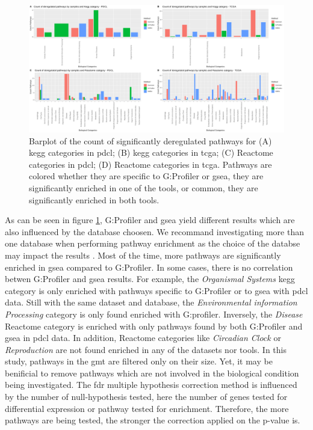 \begin{figure}
    \includegraphics[width=\textwidth]{img/barplot-categ-global}
    \caption{
        Barplot of the count of significantly deregulated pathways for (A) \acrshort{kegg} categories in \acrshort{pdcl}; (B) \acrshort{kegg} categories in \acrshort{tcga}; (C) Reactome categories in \acrshort{pdcl}; (D) Reactome categories in \acrshort{tcga}.
        Pathways are colored whether they are specific to G:Profiler or \acrshort{gsea}, they are significantly enriched in one of the tools, or common, they are significantly enriched in both tools.
    }
    \label{fig:barplot-categ-global}
\end{figure}

As can be seen in figure \ref*{fig:barplot-categ-global}, G:Profiler and \acrshort{gsea} yield different results which are also influenced by the database choosen.
We recommand investigating more than one database when performing pathway enrichment as the choice of the databse may impact the results \cite*{Mubeen2019}.
Most of the time, more pathways are significantly enriched in \acrshort{gsea} compared to G:Profiler.
In some cases, there is no correlation betwen G:Profiler and \acrshort{gsea} results.
For example, the \textit{Organismal Systems} \acrshort{kegg} category is only enriched with pathways specific to G:Profiler or to \acrshort{gsea} with \acrshort{pdcl} data.
Still with the same dataset and database, the \textit{Environmental information Processing} category is only found enriched with G:profiler.
Inversely, the \textit{Disease} Reactome category is enriched with only pathways found by both G:Profiler and \acrshort{gsea} in \acrshort{pdcl} data.
In addition, Reactome categories like \textit{Circadian Clock} or \textit{Reproduction} are not found enriched in any of the datasets nor tools.
In this study, pathways in the \acrshort{gmt} are filtered only on their size.
Yet, it may be benificial to remove pathways which are not involved in the biological condition being investigated.
The \acrshort{fdr} multiple hypothesis correction method is influenced by the number of null-hypothesis tested, here the number of genes tested for differential expression or pathway tested for enrichment.
Therefore, the more pathways are being tested, the stronger the correction applied on the p-value is.

